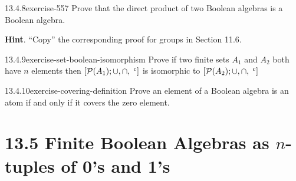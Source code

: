 \documentclass[twoside,10pt,]{book}
\numberwithin{equation}{section}
\begin{document}
\begin{divisionsolution}{13.4.8}{}{exercise-557}%
\hypertarget{p-4958}{}%
Prove that the direct product of two Boolean algebras is a Boolean algebra.%
\par\smallskip%
\noindent\textbf{Hint}.\quad%
\hypertarget{p-4959}{}%
``Copy'' the corresponding proof for groups in Section 11.6.%
\end{divisionsolution}%
\begin{divisionsolution}{13.4.9}{}{exercise-set-boolean-isomorphism}%
\hypertarget{p-4960}{}%
Prove if two finite sets \(A_1\) and \(A_2\) both have \(n\) elements then \([\mathcal{P}(A_1);  \cup , \cap, \hspace{1 mm}^c]\) is isomorphic to \([\mathcal{P}(A_2);  \cup , \cap, \hspace{1 mm}^c]\)%
\end{divisionsolution}%
\begin{divisionsolution}{13.4.10}{}{exercise-covering-definition}%
\hypertarget{p-4961}{}%
Prove an element of a Boolean algebra is an atom if and only if it covers the zero element.%
\end{divisionsolution}%
\section*{13.5 Finite Boolean Algebras as \(n\)-tuples of 0's and 1's}
\end{document}
